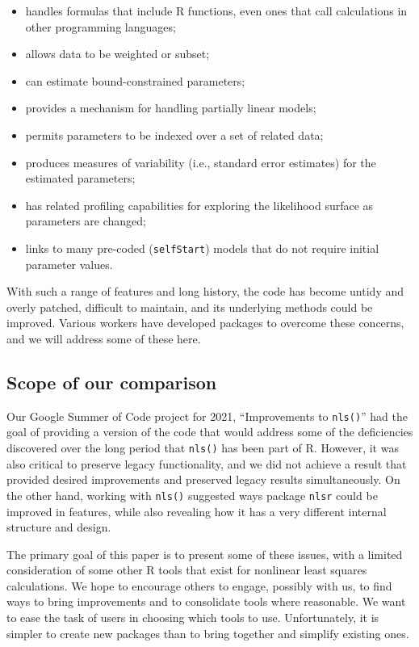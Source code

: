 \begin{itemize}
\tightlist
\item
  handles formulas that include R functions, even ones that call calculations in
  other programming languages;
\item
  allows data to be weighted or subset;
\item
  can estimate bound-constrained parameters;
\item
  provides a mechanism for handling partially linear models;
\item
  permits parameters to be indexed over a set of related data;
\item
  produces measures of variability (i.e., standard error estimates) for the
  estimated parameters;
\item
  has related profiling capabilities for exploring the likelihood surface as
  parameters are changed;
\item
  links to many pre-coded (\texttt{selfStart}) models that do not require
  initial parameter values.
\end{itemize}

With such a range of features and long history, the code has become untidy
and overly patched, difficult to maintain, and its underlying methods could
be improved. Various workers have developed packages to overcome these
concerns, and we will address some of these here.

\hypertarget{scope-of-our-comparison}{%
\subsection{Scope of our comparison}\label{scope-of-our-comparison}}

Our Google Summer of Code project for 2021, ``Improvements to \texttt{nls()}''
had the goal of providing a version of the code that would address some
of the deficiencies discovered over the long period that \texttt{nls()}
has been part of R. However, it was also critical to preserve legacy
functionality, and we did not achieve a result that provided desired
improvements and preserved legacy results simultaneously. On the other hand, working
with \texttt{nls()} suggested ways package \texttt{nlsr} could be improved
in features, while also revealing how it has a very different internal
structure and design.

The primary goal of this paper is to present some of these issues,
with a limited consideration of some other R tools that exist for
nonlinear least squares calculations. We hope to encourage
others to engage, possibly with us, to find ways to bring improvements and
to consolidate tools where reasonable. We want to ease the task of users
in choosing which tools to use. Unfortunately, it is simpler to create
new packages than to bring together and simplify existing ones.

